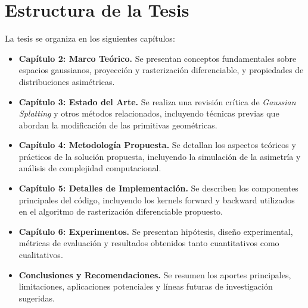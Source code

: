 \section{Estructura de la Tesis}
La tesis se organiza en los siguientes capítulos:
\begin{itemize}
    \item \textbf{Capítulo 2: Marco Teórico.} Se presentan conceptos fundamentales sobre espacios gaussianos, proyección y rasterización diferenciable, 
    y propiedades de distribuciones asimétricas.
    \item \textbf{Capítulo 3: Estado del Arte.} Se realiza una revisión crítica de \textit{Gaussian Splatting} y otros métodos relacionados, incluyendo técnicas 
    previas que abordan la modificación de las primitivas geométricas.
    \item \textbf{Capítulo 4: Metodología Propuesta.} Se detallan los aspectos teóricos y prácticos de la solución propuesta, incluyendo la simulación 
    de la asimetría y análisis de complejidad computacional.
    \item \textbf{Capítulo 5: Detalles de Implementación.} Se describen los componentes principales del código, incluyendo los kernels forward y backward 
    utilizados en el algoritmo de rasterización diferenciable propuesto.
    \item \textbf{Capítulo 6: Experimentos.} Se presentan hipótesis, diseño experimental, métricas de evaluación y resultados obtenidos tanto cuantitativos 
    como cualitativos.
    \item \textbf{Conclusiones y Recomendaciones.} Se resumen los aportes principales, limitaciones, aplicaciones potenciales y líneas futuras de 
    investigación sugeridas.
\end{itemize}
